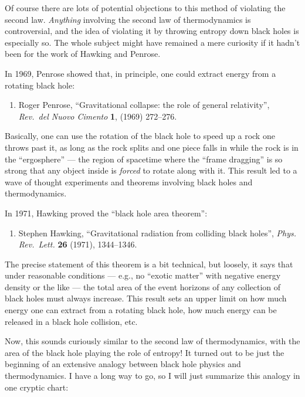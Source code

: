 \documentclass{article}
\def\tightlist{}
\begin{document}
Of course there are lots of potential objections to this method of
violating the second law. \emph{Anything} involving the second law of
thermodynamics is controversial, and the idea of violating it by
throwing entropy down black holes is especially so. The whole subject
might have remained a mere curiosity if it hadn't been for the work of
Hawking and Penrose.

In 1969, Penrose showed that, in principle, one could extract energy
from a rotating black hole:

\begin{enumerate}
\def\labelenumi{\arabic{enumi})}
\tightlist
\item
  Roger Penrose, ``Gravitational collapse: the role of general
  relativity'', \emph{Rev.~del Nuovo Cimento} \textbf{1}, (1969)
  272--276.
\end{enumerate}

Basically, one can use the rotation of the black hole to speed up a rock
one throws past it, as long as the rock splits and one piece falls in
while the rock is in the ``ergosphere'' --- the region of spacetime
where the ``frame dragging'' is so strong that any object inside is
\emph{forced} to rotate along with it. This result led to a wave of
thought experiments and theorems involving black holes and
thermodynamics.

In 1971, Hawking proved the ``black hole area theorem'':

\begin{enumerate}
\def\labelenumi{\arabic{enumi})}
\setcounter{enumi}{1}
\tightlist
\item
  Stephen Hawking, ``Gravitational radiation from colliding black
  holes'', \emph{Phys. Rev.~Lett.} \textbf{26} (1971), 1344--1346.
\end{enumerate}

The precise statement of this theorem is a bit technical, but loosely,
it says that under reasonable conditions --- e.g., no ``exotic matter''
with negative energy density or the like --- the total area of the event
horizons of any collection of black holes must always increase. This
result sets an upper limit on how much energy one can extract from a
rotating black hole, how much energy can be released in a black hole
collision, etc.

Now, this sounds curiously similar to the second law of thermodynamics,
with the area of the black hole playing the role of entropy! It turned
out to be just the beginning of an extensive analogy between black hole
physics and thermodynamics. I have a long way to go, so I will just
summarize this analogy in one cryptic chart:
\end{document}
